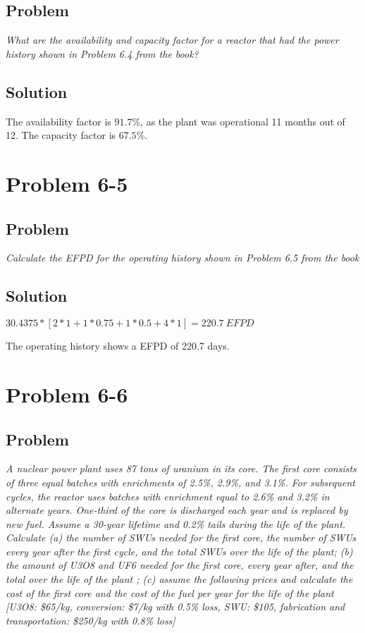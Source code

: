\subsection{Problem}
\textit{What are the availability and capacity factor for a reactor that had the power history shown in Problem 6.4 from the book?}

\subsection{Solution}

The availability factor is $91.7\%$, as the plant was operational 11 months out of 12. The capacity factor is $67.5\%$.

\section{Problem 6-5}
\label{prob65}


\subsection{Problem}
\textit{Calculate the EFPD for the operating history shown in Problem 6.5 from the book}

\subsection{Solution}

$30.4375 * [2*1 + 1*0.75 + 1*0.5 + 4*1] = 220.7\ EFPD$

The operating history shows a EFPD of 220.7 days.


\section{Problem 6-6}
\label{prob66}


\subsection{Problem}
\textit{A nuclear power plant uses 87 tons of uranium in its core. The first core consists of three equal batches with enrichments of 2.5\%, 2.9\%, and 3.1\%. For subsequent cycles, the reactor uses batches with enrichment equal to 2.6\% and 3.2\% in alternate years. One-third of the core is discharged each year and is replaced by new fuel. Assume a 30-year lifetime and 0.2\% tails during the life of the plant. Calculate (a) the number of SWUs needed for the first core, the number of SWUs every year after the first cycle, and the total SWUs over the life of the plant; (b) the amount of U3O8 and UF6 needed for the first core, every year after, and the total over the life of the plant ; (c) assume the following prices and calculate the cost of the first core and the cost of the fuel per year for the life of the plant [U3O8: \$65/kg, conversion: \$7/kg with 0.5\% loss, SWU: \$105, fabrication and transportation: \$250/kg with 0.8\% loss]}

